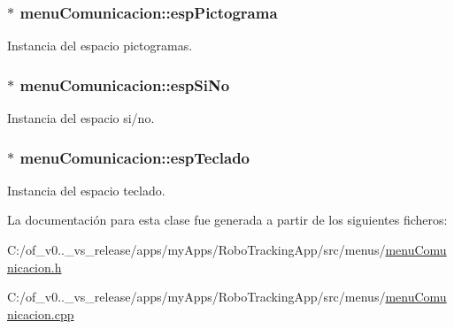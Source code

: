 \subsubsection[{esp\+Pictograma}]{$\ast$ menu\+Comunicacion\+::esp\+Pictograma\hspace{0.3cm}{\ttfamily [private]}}\label{classmenu_comunicacion_ac00c26aae43f331167e102e2b6d7b86c}


Instancia del espacio pictogramas. 

\hypertarget{classmenu_comunicacion_ab9fc64713344f895347473d97f555a8e}{}
\subsubsection[{esp\+Si\+No}]{$\ast$ menu\+Comunicacion\+::esp\+Si\+No\hspace{0.3cm}{\ttfamily [private]}}\label{classmenu_comunicacion_ab9fc64713344f895347473d97f555a8e}


Instancia del espacio si/no. 

\hypertarget{classmenu_comunicacion_a01b499ef3e349868508abfd4f856bbea}{}
\subsubsection[{esp\+Teclado}]{$\ast$ menu\+Comunicacion\+::esp\+Teclado\hspace{0.3cm}{\ttfamily [private]}}\label{classmenu_comunicacion_a01b499ef3e349868508abfd4f856bbea}


Instancia del espacio teclado. 



La documentación para esta clase fue generada a partir de los siguientes ficheros\+:\begin{DoxyCompactItemize}
\item 
C\+:/of\+\_\+v0..\+\_\+vs\+\_\+release/apps/my\+Apps/\+Robo\+Tracking\+App/src/menus/\hyperlink{menu_comunicacion_8h}{menu\+Comunicacion.\+h}\item 
C\+:/of\+\_\+v0..\+\_\+vs\+\_\+release/apps/my\+Apps/\+Robo\+Tracking\+App/src/menus/\hyperlink{menu_comunicacion_8cpp}{menu\+Comunicacion.\+cpp}\end{DoxyCompactItemize}
